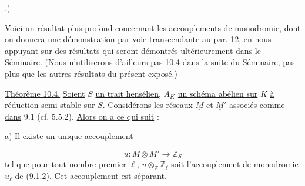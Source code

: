\begin{center}
\end{center}
.)

Voici un résultat plus profond concernant les accouplements de monodromie, dont on donnera une démonstration par voie transcendante au par. 12, en nous appuyant sur des résultats qui seront démontrés ultérieurement dans le Séminaire. (Nous n'utiliserons d'ailleurs pas 10.4 dans la suite du Séminaire, pas plus que les autres résultats du présent exposé.)



\underline{Théorème 10.4.} \underline{Soient} $S$ \underline{un trait hensélien,} $A_K$ \underline{un schéma abélien sur} $K$ \underline{à réduction semi-stable sur} $S$. \underline{Considérons les réseaux} $\underline{M}$ \underline{et} $\underline{M}'$ \underline{associés comme dans} 9.1 (cf. 5.5.2). \underline{Alors on a ce qui suit} :

a) \underline{Il existe un unique accouplement}

\begin{equation}\tag{10.4.1}
u: \underline{M} \otimes \underline{M}' \longrightarrow \mathbb{Z}_S
\end{equation}
\underline{tel que pour tout nombre premier} $\ell$, $u \otimes_{\mathbb{Z}} \mathbb{Z}_\ell$ \underline{soit l'accouplement de monodromie} $u_\ell$ \underline{de} (9.1.2). \underline{Cet accouplement est séparant.}

